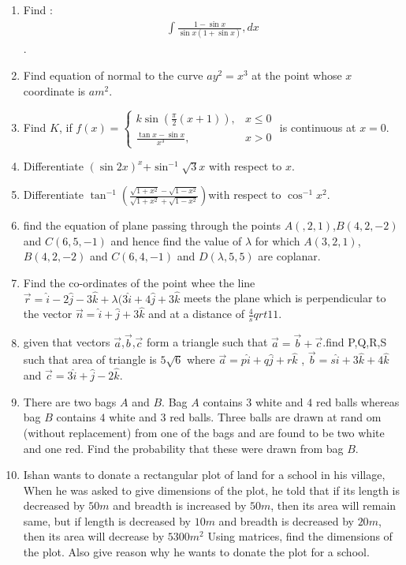\documentclass[12pt,-letter paper]{article}
\begin{document}
\begin{enumerate}
\item Find : \begin{align*}\int\frac{1-\sin{x}}{\sin{x}(1+\sin{x})},dx\end{align*}.
\item Find equation of normal to the curve $ay^2=x^3$ at the point whose $x$ coordinate is $am^2$. 
\item Find $K$, if $f(x) = \begin{cases}
 k \sin\left(\frac{\pi}{2}(x+1)\right), & x \leq 0 \\
\frac{\tan {x} - \sin{x}}{x^3}, & x > 0 \end{cases}$ is continuous at $x = 0$.
\item Differentiate $(\sin2x)^x$+$\sin^{-1}\sqrt3x$ with respect to $x$.
\item Differentiate $\tan^{-1}{(\frac{\sqrt{1+x^2}-\sqrt{1-x^2}}{\sqrt{1+x^2}+\sqrt{1-x^2}}) }$with respect to $\cos^{-1}{x^2}$.
\item find the equation of plane passing through the points $A(,2,1)$,$B(4,2,-2)$ and $C(6,5,-1)$ and hence find the value of $\lambda $ for which $ A(3,2,1)$,$B(4,2,-2)$ and $C(6,4,-1)$ and $D(\lambda,5,5)$ are coplanar.
\item Find the co-ordinates of the point whee the line $\overrightarrow{r}=\hat{i}-2\hat{j}-3\hat{k}+\lambda(3\hat{i}+4\hat{j}+3\hat{k}$ meets the plane which is perpendicular to the vector $\overrightarrow{n}=\hat{i}+\hat{j}+3\hat{k}$ and at a distance of $\frac{4}sqrt{11}$.
\item given that vectors $\overrightarrow{a}$,$\overrightarrow{b}$,$\overrightarrow{c}$ form a triangle such that $\overrightarrow{a}=\overrightarrow{b}+\overrightarrow{c}$.find P,Q,R,S such that area  of triangle is $5\sqrt{6}$ where $\overrightarrow{a}=p\hat{i}+q\hat{j}+r\hat{k}$ , $\overrightarrow{b}=s\hat{i}+3\hat{k}+4\hat{k}$ and $\overrightarrow{c}=3\hat{i}+\hat{j}-2\hat{k}$. 
\item There are two bags $A$ and $B$. Bag $A$ contains $3$ white and $4$ red balls whereas bag $B$ contains $4$ white and $3$ red balls. Three balls are drawn at rand    om (without replacement) from one of the bags and are found to be two white and     one red. Find the probability that these were drawn from bag $B$.
\item Ishan wants to donate a rectangular plot of land for a school in his village, When he was asked to give dimensions of the plot, he told that  if its length is decreased by $50 m$ and breadth is increased by $50 m$,     then its area will remain same, but if length is decreased by $10 m$ and     breadth is decreased by   $20 m$, then its area will decrease by $5300 m     ^ 2 $  Using matrices, find the dimensions of the plot. Also give reason  why he wants to donate the plot for a school.

\end{enumerate}
\end{document}
